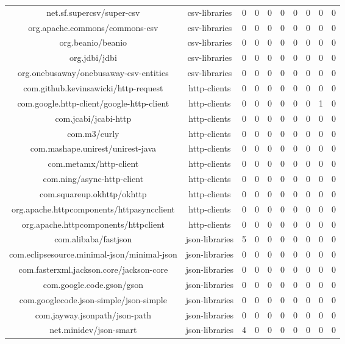 \begin{center}
{\begin{tabular}{|c|c|c|c|c|c|c|c|c|c|}
net.sf.supercsv/super-csv & csv-libraries & 0 & 0 & 0 & 0 & 0 & 0 & 0 & 0 \\
org.apache.commons/commons-csv & csv-libraries & 0 & 0 & 0 & 0 & 0 & 0 & 0 & 0 \\
org.beanio/beanio & csv-libraries & 0 & 0 & 0 & 0 & 0 & 0 & 0 & 0 \\
org.jdbi/jdbi & csv-libraries & 0 & 0 & 0 & 0 & 0 & 0 & 0 & 0 \\
org.onebusaway/onebusaway-csv-entities & csv-libraries & 0 & 0 & 0 & 0 & 0 & 0 & 0 & 0 \\
com.github.kevinsawicki/http-request & http-clients & 0 & 0 & 0 & 0 & 0 & 0 & 0 & 0 \\
com.google.http-client/google-http-client & http-clients & 0 & 0 & 0 & 0 & 0 & 0 & 1 & 0 \\
com.jcabi/jcabi-http & http-clients & 0 & 0 & 0 & 0 & 0 & 0 & 0 & 0 \\
com.m3/curly & http-clients & 0 & 0 & 0 & 0 & 0 & 0 & 0 & 0 \\
com.mashape.unirest/unirest-java & http-clients & 0 & 0 & 0 & 0 & 0 & 0 & 0 & 0 \\
com.metamx/http-client & http-clients & 0 & 0 & 0 & 0 & 0 & 0 & 0 & 0 \\
com.ning/async-http-client & http-clients & 0 & 0 & 0 & 0 & 0 & 0 & 0 & 0 \\
com.squareup.okhttp/okhttp & http-clients & 0 & 0 & 0 & 0 & 0 & 0 & 0 & 0 \\
org.apache.httpcomponents/httpasyncclient & http-clients & 0 & 0 & 0 & 0 & 0 & 0 & 0 & 0 \\
org.apache.httpcomponents/httpclient & http-clients & 0 & 0 & 0 & 0 & 0 & 0 & 0 & 0 \\
com.alibaba/fastjson & json-libraries & 5 & 0 & 0 & 0 & 0 & 0 & 0 & 0 \\
com.eclipsesource.minimal-json/minimal-json & json-libraries & 0 & 0 & 0 & 0 & 0 & 0 & 0 & 0 \\
com.fasterxml.jackson.core/jackson-core & json-libraries & 0 & 0 & 0 & 0 & 0 & 0 & 0 & 0 \\
com.google.code.gson/gson & json-libraries & 0 & 0 & 0 & 0 & 0 & 0 & 0 & 0 \\
com.googlecode.json-simple/json-simple & json-libraries & 0 & 0 & 0 & 0 & 0 & 0 & 0 & 0 \\
com.jayway.jsonpath/json-path & json-libraries & 0 & 0 & 0 & 0 & 0 & 0 & 0 & 0 \\
net.minidev/json-smart & json-libraries & 4 & 0 & 0 & 0 & 0 & 0 & 0 & 0 \\

\end{tabular}}
\end{center}

